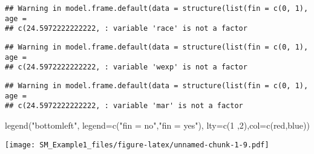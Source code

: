 \documentclass[
]{article}
\newenvironment{Shaded}{\begin{snugshade}}{\end{snugshade}}
\newcommand{\AttributeTok}[1]{\textcolor[rgb]{0.77,0.63,0.00}{#1}}
\newcommand{\DecValTok}[1]{\textcolor[rgb]{0.00,0.00,0.81}{#1}}
\newcommand{\FunctionTok}[1]{\textcolor[rgb]{0.00,0.00,0.00}{#1}}
\newcommand{\NormalTok}[1]{#1}
\newcommand{\StringTok}[1]{\textcolor[rgb]{0.31,0.60,0.02}{#1}}
\begin{document}
\begin{verbatim}
## Warning in model.frame.default(data = structure(list(fin = c(0, 1), age =
## c(24.5972222222222, : variable 'race' is not a factor
\end{verbatim}

\begin{verbatim}
## Warning in model.frame.default(data = structure(list(fin = c(0, 1), age =
## c(24.5972222222222, : variable 'wexp' is not a factor
\end{verbatim}

\begin{verbatim}
## Warning in model.frame.default(data = structure(list(fin = c(0, 1), age =
## c(24.5972222222222, : variable 'mar' is not a factor
\end{verbatim}

\begin{Shaded}
\begin{Highlighting}[]
\FunctionTok{legend}\NormalTok{(}\StringTok{"bottomleft"}\NormalTok{, }\AttributeTok{legend=}\FunctionTok{c}\NormalTok{(}\StringTok{"fin = no"}\NormalTok{,}\StringTok{"fin = yes"}\NormalTok{), }
       \AttributeTok{lty=}\FunctionTok{c}\NormalTok{(}\DecValTok{1}\NormalTok{ ,}\DecValTok{2}\NormalTok{),}\AttributeTok{col=}\FunctionTok{c}\NormalTok{(}\StringTok{\textquotesingle{}red\textquotesingle{}}\NormalTok{,}\StringTok{\textquotesingle{}blue\textquotesingle{}}\NormalTok{))}
\end{Highlighting}
\end{Shaded}

\texttt{[image: SM\_Example1\_files/figure-latex/unnamed-chunk-1-9.pdf]}
\end{document}
